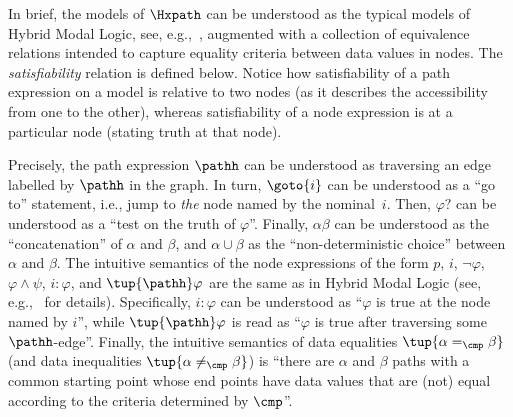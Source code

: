 In brief, the models of $\Hxpath$ can be understood as the typical models of Hybrid Modal Logic, see, e.g.,~\cite{arec:hybr05b}, augmented with a collection of equivalence relations intended to capture equality criteria between data values in nodes.
The \emph{satisfiability} relation is defined below. Notice how satisfiability of a path expression on a model is relative to two nodes (as it describes the accessibility from one to the other), whereas satisfiability of a node expression is at a particular node (stating truth at that node). 

Precisely, the path expression $\pathh$ can be understood as traversing an edge labelled by $\pathh$ in the graph.
In turn, $\goto{i}$ can be understood as a ``go to'' statement, i.e., jump to \emph{the} node named by the nominal~$i$.
Then, $\varphi?$ can be understood as a ``test on the truth of $\varphi$''. %
Finally, $\alpha\beta$ can be understood as the ``concatenation'' of $\alpha$ and $\beta$, 
and $\alpha \cup \beta$ as the ``non-deterministic choice'' between $\alpha$ and $\beta$. %
The intuitive semantics of the node expressions of the form $p$, $i$, $\lnot\varphi$, $\varphi \land \psi$, $i{:}\varphi$, and $\tup{\pathh}\varphi$ are the same as in Hybrid Modal Logic (see, e.g.,~\cite{arec:hybr05b} for details). 
Specifically, %
$i{:}\varphi$ can be understood as ``$\varphi$ is true at the node named by $i$'', while $\tup{\pathh}\varphi$ is read as ``$\varphi$ is true after traversing some  $\pathh$-edge''.
Finally, the intuitive semantics of data equalities $\tup{\alpha =_{\cmp} \beta}$ (and data inequalities $\tup{\alpha \neq_{\cmp} \beta}$) is ``there are $\alpha$ and $\beta$ paths with a common starting point whose end points have data values that are (not) equal according to the criteria determined by $\cmp$''.


